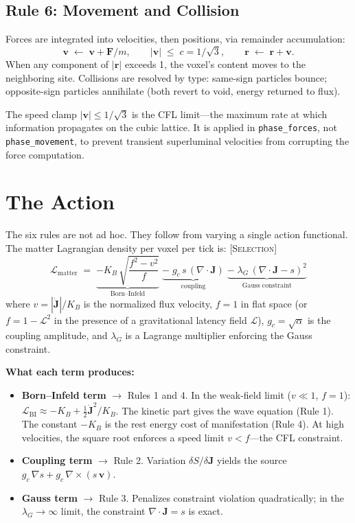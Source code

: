 \documentclass[11pt,a4paper]{article}
\newcommand{\KB}{K_B}
\newcommand{\etag}[1]{{\normalfont\textsc{\footnotesize [#1]}}}
\theoremstyle{compact}
\begin{document}
\subsection*{Rule 6: Movement and Collision \quad\normalfont\etag{Theorem}}

Forces are integrated into velocities, then positions, via remainder accumulation:
\[
\mathbf{v} \;\leftarrow\; \mathbf{v} + \mathbf{F}/m, \qquad |\mathbf{v}| \;\leq\; c = 1/\sqrt{3}, \qquad \mathbf{r} \;\leftarrow\; \mathbf{r} + \mathbf{v}.
\]
When any component of $|\mathbf{r}|$ exceeds 1, the voxel's content moves to the neighboring site. Collisions are resolved by type: same-sign particles bounce; opposite-sign particles annihilate (both revert to void, energy returned to flux).

The speed clamp $|\mathbf{v}| \leq 1/\sqrt{3}$ is the CFL limit---the maximum rate at which information propagates on the cubic lattice. It is applied in \texttt{phase\_forces}, not \texttt{phase\_movement}, to prevent transient superluminal velocities from corrupting the force computation.


\section{The Action}
\label{sec:action}

The six rules are not ad hoc. They follow from varying a single action functional. The matter Lagrangian density per voxel per tick is: \etag{Selection}
\[
\mathcal{L}_{\mathrm{matter}} \;=\; \underbrace{-\KB\,\sqrt{\frac{f^2 - v^2}{f}}}_{\text{Born--Infeld}} \;\underbrace{-\; g_c\,s\,(\nabla \cdot \mathbf{J})}_{\text{coupling}} \;\underbrace{-\; \lambda_G\,(\nabla \cdot \mathbf{J} - s)^2}_{\text{Gauss constraint}}
\]
where $v = |\dot{\mathbf{J}}|/\KB$ is the normalized flux velocity, $f = 1$ in flat space (or $f = 1 - \mathcal{L}^2$ in the presence of a gravitational latency field $\mathcal{L}$), $g_c = \sqrt{\alpha}$ is the coupling amplitude, and $\lambda_G$ is a Lagrange multiplier enforcing the Gauss constraint.

\smallskip\noindent\textbf{What each term produces:}

\begin{itemize}[nosep]
\item \textbf{Born--Infeld term} $\to$ Rules 1 and 4. In the weak-field limit ($v \ll 1$, $f = 1$): $\mathcal{L}_{\mathrm{BI}} \approx -\KB + \frac{1}{2}\dot{\mathbf{J}}^2/\KB$. The kinetic part gives the wave equation (Rule 1). The constant $-\KB$ is the rest energy cost of manifestation (Rule 4). At high velocities, the square root enforces a speed limit $v < f$---the CFL constraint.
\item \textbf{Coupling term} $\to$ Rule 2. Variation $\delta S/\delta \mathbf{J}$ yields the source $g_c\,\nabla s + g_c\,\nabla \times (s\,\mathbf{v})$.
\item \textbf{Gauss term} $\to$ Rule 3. Penalizes constraint violation quadratically; in the $\lambda_G \to \infty$ limit, the constraint $\nabla \cdot \mathbf{J} = s$ is exact.
\end{itemize}
\end{document}
